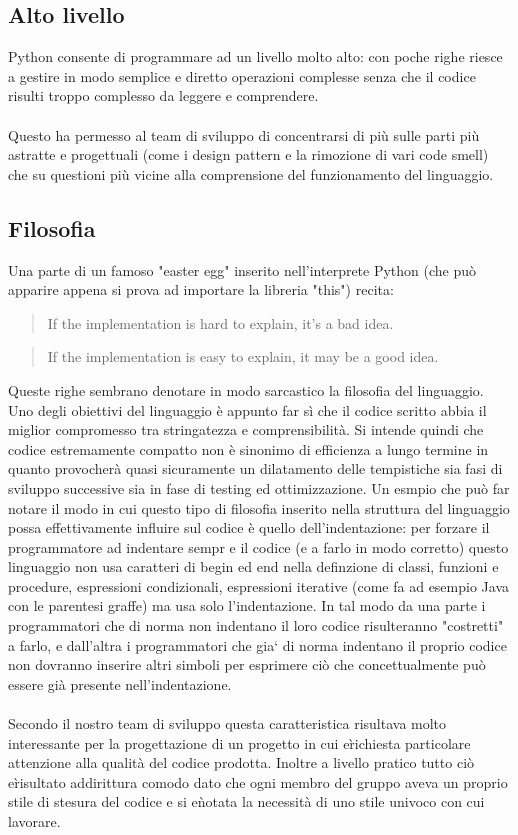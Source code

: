\documentclass[12pt]{scrartcl}
\begin{document}
\subsection{Alto livello}
Python consente di programmare ad un livello molto alto: con poche righe riesce a gestire
in modo semplice e diretto operazioni complesse senza che il codice risulti troppo complesso da leggere e comprendere.
\\ \\
Questo ha permesso al team di sviluppo di concentrarsi di pi\`u sulle parti pi\`u astratte
e progettuali (come i design pattern e la rimozione di vari code smell) che
su questioni pi\`u vicine alla comprensione del funzionamento del linguaggio.
\subsection{Filosofia}
Una parte di un famoso "easter egg" inserito nell'interprete Python (che pu\`o apparire appena si
prova ad importare la libreria "this") recita:
\begin{quotation}
If the implementation is hard to explain, it's a bad idea.
\end{quotation}

\begin{quotation}
If the implementation is easy to explain, it may be a good idea.
\end{quotation}
Queste righe sembrano denotare in modo sarcastico la filosofia del linguaggio.
Uno degli obiettivi del linguaggio \`e appunto far s\`i che il codice scritto
abbia il miglior compromesso tra stringatezza e comprensibilit\`a. Si intende
quindi che codice estremamente compatto non \`e sinonimo di efficienza a lungo termine
in quanto provocher\`a quasi sicuramente un dilatamento delle tempistiche
sia fasi di sviluppo successive sia in fase di testing ed ottimizzazione.
Un esmpio che pu\`o far notare il modo in cui questo tipo di filosofia inserito
nella struttura del linguaggio possa effettivamente influire sul codice \`e 
quello dell'indentazione: per forzare il programmatore ad indentare sempr
e il codice (e a farlo in modo corretto) questo linguaggio non usa caratteri
di begin ed end nella definzione di classi, funzioni e procedure,
espressioni condizionali, espressioni iterative (come fa ad esempio Java con le
parentesi graffe) ma usa solo l'indentazione. In tal modo da una parte i programmatori
che di norma non indentano il loro codice risulteranno "costretti" a farlo,
e dall'altra i programmatori che gia` di norma indentano il proprio codice
non dovranno inserire altri simboli per esprimere ci\`o che concettualmente
pu\`o essere gi\`a presente nell'indentazione. \\ \\
Secondo il nostro team di sviluppo questa caratteristica risultava molto
interessante per la progettazione di un progetto in cui e\` richiesta
particolare attenzione alla qualit\`a del codice prodotta. Inoltre a livello
pratico tutto ci\`o e\` risultato addirittura comodo dato che ogni membro
del gruppo aveva un proprio stile di stesura del codice e si e\` notata la
necessit\`a di uno stile univoco con cui lavorare.

\begin{thebibliography}{10}	


\end{thebibliography}
\end{document}
